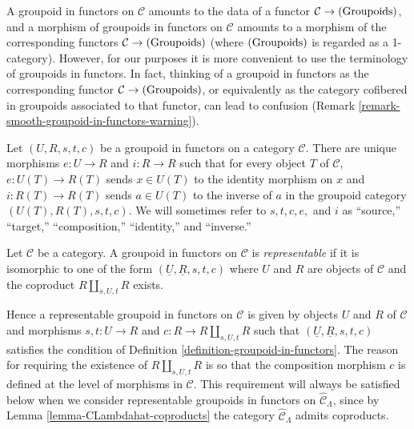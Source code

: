 \begin{remark}
A groupoid in functors on $\mathcal C$ amounts to the data of a functor $ 
\mathcal C \rightarrow \textnormal{(Groupoids)}$, and a morphism of groupoids 
in functors on $\mathcal C$ amounts to a morphism of the corresponding functors 
$\mathcal C \rightarrow \textnormal{(Groupoids)}$ (where 
$\textnormal{(Groupoids)}$ is regarded as a 1-category).  However, for our 
purposes it is more convenient to use the terminology of groupoids in functors. 
 In fact, thinking of a groupoid in functors as the corresponding functor 
$\mathcal C \rightarrow \textnormal{(Groupoids)}$, or equivalently as the 
category cofibered in groupoids associated to that functor, can lead to 
confusion (Remark \ref{remark-smooth-groupoid-in-functors-warning}).
\end{remark}

\begin{remark}
Let $(U,R,s,t,c)$ be a groupoid in functors on a category $\mathcal C$. There 
are unique morphisms $e: U \rightarrow R$ and $i: R \rightarrow R$ such that 
for every object $T$ of $\mathcal C$, $e: U(T) \rightarrow R(T)$ sends $x \in 
U(T)$ to the identity morphism on $x$ and $i: R(T) \rightarrow R(T)$ sends $a 
\in U(T)$ to the inverse of $a$ in the groupoid category $(U(T),R(T),s,t,c)$. 
We will sometimes refer to $s,t,c,e,$ and $i$ as ``source,'' ``target,'' 
``composition,'' ``identity,'' and ``inverse.''
\end{remark}

\begin{definition}
Let $\mathcal C$ be a category.  A groupoid in functors on $\mathcal C$ is 
\emph{representable} if it is isomorphic to one of the form $(\underline{U}, 
\underline{R}, s,t,c)$ where $U$ and $R$ are objects of $\mathcal C$ and the 
coproduct $R \coprod_{s,U,t} R$ exists.
\end{definition}

\begin{remark}
Hence a representable groupoid in functors on $\mathcal C$ is given by objects 
$U$ and $R$ of $\mathcal C$ and morphisms $s,t: U \rightarrow R$ and $c: R 
\rightarrow R \coprod_{s,U,t} R$ such that 
$(\underline{U},\underline{R},s,t,c)$ satisfies the condition of Definition 
\ref{definition-groupoid-in-functors}. The reason for requiring the existence 
of $R \coprod_{s,U,t} R$ is so that the composition morphism $c$ is defined at 
the level of morphisms in $\mathcal C$.  This requirement will always be 
satisfied below when we consider representable groupoids in functors on 
$\widehat{\mathcal C}_{\Lambda}$, since by Lemma 
\ref{lemma-CLambdahat-coproducts} the category $\widehat{\mathcal C}_{\Lambda}$ 
admits coproducts.
\end{remark}

